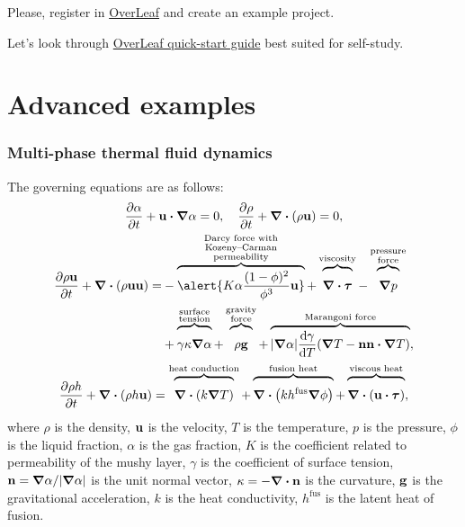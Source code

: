 \documentclass[mathserif]{beamer}
\newcommand{\bv}{\vb{u}}                    %
\newcommand{\bn}{\vb{n}}                    %
\newcommand{\fusion}[1]{{#1}^\mathrm{fus}}  %
\newcommand{\xoverbrace}[2][\vphantom{\int}]{\overbrace{#1#2}}
\begin{document}
\begin{frame}
    \frametitle{}
    \centering
    Please, register in \href{https://overleaf.com}{OverLeaf}
    and create an example project.
    \pause

    Let's look through \href{https://www.overleaf.com/learn/latex/Learn_LaTeX_in_30_minutes}
    {OverLeaf quick-start guide} best suited for self-study.
\end{frame}

\section{Advanced examples}

\begin{frame}
    \frametitle{Multi-phase thermal fluid dynamics}\footnotesize
    The governing equations are as follows:
    \begin{gather*}
        \pdv{\alpha}{t} + \bv\vdot\grad\alpha = 0, \quad \pdv{\rho}{t} + \div(\rho\bv) = 0, \\
        \begin{aligned}
        \pdv{\rho\bv}{t} + \div(\rho\bv\bv) =
            &- \xoverbrace{\alert{K\alpha\frac{(1-\phi)^2}{\phi^3}\bv}}
                ^{\substack{\text{Darcy force with}\\\text{Kozeny--Carman}\\\text{permeability}}}
            + \xoverbrace{\div\vb*\tau}^\text{viscosity}
            - \xoverbrace{\grad{p}}^{\substack{\text{pressure}\\\text{force}}}\\
            &+ \xoverbrace{\gamma\kappa\grad\alpha}^{\substack{\text{surface}\\\text{tension}}}
            + \xoverbrace{\rho\vb{g}}^{\substack{\text{gravity}\\\text{force}}}
            + \xoverbrace{|\grad\alpha|\dv{\gamma}{T}\qty(\grad{T}
                - \bn\bn\vdot\grad{T})}^\text{Marangoni force},
        \end{aligned}\\
        \pdv{\rho h}{t} + \div(\rho h\bv)
            = \xoverbrace{\div(k\grad{T})}^\text{heat conduction}
            + \xoverbrace{\div(k\fusion{h}\grad{\phi})}^\text{fusion heat}
            + \xoverbrace{\div(\bv\vdot\vb*\tau)}^\text{viscous heat},
    \end{gather*}
    \scriptsize
    where \(\rho\) is the density, \(\bv\) is the velocity, \(T\) is the temperature,
    \(p\) is the pressure, \(\phi\) is the liquid fraction, \(\alpha\) is the gas fraction,
    \(K\) is the coefficient related to permeability of the mushy layer,
     \(\gamma\) is the coefficient of surface tension,
    \(\bn = \grad\alpha/|\grad\alpha|\) is the unit normal vector,
    \(\kappa = -\div{\bn}\) is the curvature, \(\vb{g}\) is the gravitational acceleration,
    \(k\) is the heat conductivity, \(\fusion{h}\) is the latent heat of fusion.
\end{frame}
\end{document}

